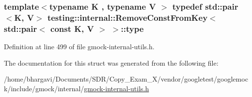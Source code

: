 \subsubsection[{\texorpdfstring{type}{type}}]{\setlength{\rightskip}{0pt plus 5cm}template$<$typename K , typename V $>$ typedef std\+::pair$<$K, V$>$ {\bf testing\+::internal\+::\+Remove\+Const\+From\+Key}$<$ std\+::pair$<$ const K, V $>$ $>$\+::{\bf type}}\hypertarget{structtesting_1_1internal_1_1_remove_const_from_key_3_01std_1_1pair_3_01const_01_k_00_01_v_01_4_01_4_ac1d76274964aa8172889a4714246e86f}{}\label{structtesting_1_1internal_1_1_remove_const_from_key_3_01std_1_1pair_3_01const_01_k_00_01_v_01_4_01_4_ac1d76274964aa8172889a4714246e86f}


Definition at line 499 of file gmock-\/internal-\/utils.\+h.



The documentation for this struct was generated from the following file\+:\begin{DoxyCompactItemize}
\item 
/home/bhargavi/\+Documents/\+S\+D\+R/\+Copy\+\_\+\+Exam\+\_\+X/vendor/googletest/googlemock/include/gmock/internal/\hyperlink{gmock-internal-utils_8h}{gmock-\/internal-\/utils.\+h}\end{DoxyCompactItemize}
